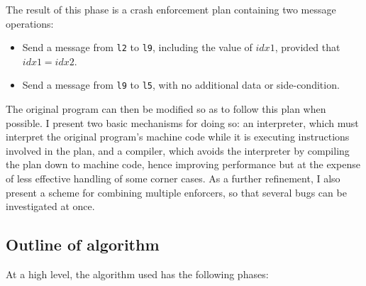 The result of this phase is a crash enforcement plan containing two
message operations:

\begin{itemize}
\item Send a message from \verb|l2| to \verb|l9|, including the value
  of $idx1$, provided that $idx1 = idx2$.
\item Send a message from \verb|l9| to \verb|l5|, with no additional
  data or side-condition.
\end{itemize}

The original program can then be modified so as to follow this plan
when possible.  I present two basic mechanisms for doing so: an
interpreter, which must interpret the original program's machine code
while it is executing instructions involved in the plan, and a
compiler, which avoids the interpreter by compiling the plan down to
machine code, hence improving performance but at the expense of less
effective handling of some corner cases.  As a further refinement, I
also present a scheme for combining multiple enforcers, so that
several bugs can be investigated at once.


\subsection{Outline of algorithm}

At a high level, the algorithm used has the following phases:

